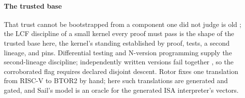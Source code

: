 \paragraph{The trusted base}
That trust cannot be bootstrapped from a component one did not judge
is old \citep{thompson1984trust}; the LCF discipline of a small
kernel every proof must pass \citep{gordon1979lcf} is the shape of
the trusted base here, the kernel's standing established by proof,
tests, a second lineage, and pins. Differential testing
\citep{mckeeman1998difftest,yang2011csmith} and N-version programming
\citep{avizienis1985nversion} supply the second-lineage discipline;
independently written versions fail together
\citep{knight1986independence}, so the corroborated flag requires
declared disjoint descent. Rotor \citep{rotor2017basics} fixes one
translation from RISC-V to BTOR2 by hand; here such translations are
generated and gated, and Sail's model \citep{armstrong2019sail} is an
oracle for the generated ISA interpreter's vectors.
